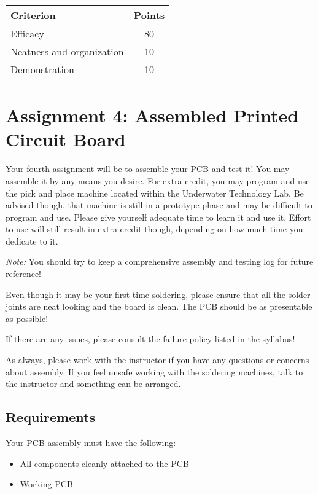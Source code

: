     \begin{table}[h!]
        \begin{tabular}{l | c}
            \toprule
            Criterion & Points \\
            \midrule
            Efficacy & 80 \\
            Neatness and organization & 10 \\
            Demonstration & 10 \\
            \bottomrule
        \end{tabular}
    \end{table}

\section*{Assignment 4: Assembled Printed Circuit Board}
Your fourth assignment will be to assemble your PCB and test it!
You may assemble it by any means you desire.
For extra credit, you may program and use the pick and place machine located within the Underwater Technology Lab.
Be advised though, that machine is still in a prototype phase and may be difficult to program and use.
Please give yourself adequate time to learn it and use it.
Effort to use will still result in extra credit though, depending on how much time you dedicate to it.

\emph{Note:} You should try to keep a comprehensive assembly and testing log for future reference!

Even though it may be your first time soldering, please ensure that all the solder joints are neat looking and the board is clean.
The PCB should be as presentable as possible!

If there are any issues, please consult the failure policy listed in the syllabus!

As always, please work with the instructor if you have any questions or concerns about assembly.
If you feel unsafe working with the soldering machines, talk to the instructor and something can be arranged.

    \subsection*{Requirements}
    Your PCB assembly must have the following:
    \begin{itemize}
        \item All components cleanly attached to the PCB
        \item Working PCB
    \end{itemize}

